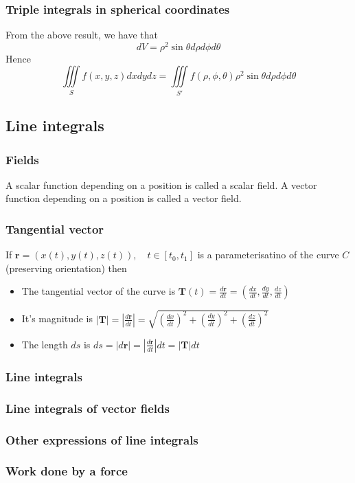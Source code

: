 \documentclass[12pt]{article}
\begin{document}
		\subsubsection{Triple integrals in spherical coordinates}
		From the above result, we have that
		\[
			dV = \rho^2 \sin{\theta} d\rho d\phi d\theta
		\]
		Hence
		\[
			\iiint\limits_S f(x,y,z) dxdydz = \iiint\limits_{S'} f( \rho, \phi, \theta) \rho^2 \sin{\theta} d\rho d\phi d\theta
		\]
		
	\subsection{Line integrals}
		\subsubsection{Fields}
		\begin{defn}
			A scalar function depending on a position is called a scalar field. A vector function depending on a position is called a vector field.
		\end{defn}
		
		\subsubsection{Tangential vector}
		If $\mathbf{r} = (x(t), y(t), z(t)), \quad t \in [t_0, t_1]$ is a parameterisatino of the curve $C$ (preserving orientation) then
		\begin{itemize}
			\item The tangential vector of the curve is $\mathbf{T}(t) = \frac{d\mathbf{r}}{dt} = \left( \frac{dx}{dt}, \frac{dy}{dt}, \frac{dz}{dt} \right)$
			\item It's magnitude is $\left| \mathbf{T} \right| = \left| \frac{d\mathbf{r}}{dt} \right| = \sqrt{ \left( \frac{dx}{dt} \right)^2 + \left( \frac{dy}{dt} \right)^2 + \left( \frac{dz}{dt} \right)^2   }$
			\item The length $ds$ is $ds = \left| d\mathbf{r} \right| = \left| \frac{d\mathbf{r}}{dt} \right|dt = \left| \mathbf{T} \right| dt$
		\end{itemize}
		
		\subsubsection{Line integrals}
		
		
		\subsubsection{Line integrals of vector fields}
		\subsubsection{Other expressions of line integrals}
		\subsubsection{Work done by a force}
	
\end{document}
